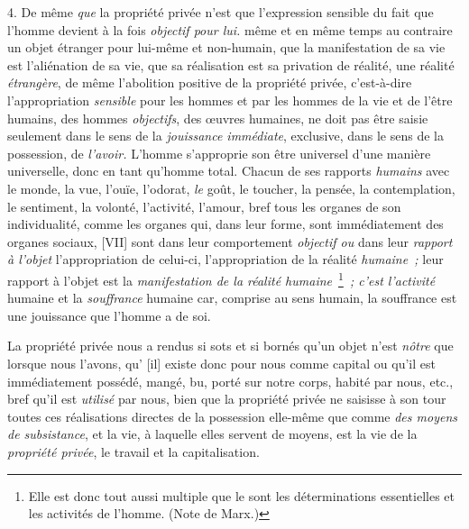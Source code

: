 \documentclass[french,twoside]{book} %
\begin{document}
4. De même \emph{que} la propriété privée n’est que l’expression sensible du fait que l’homme devient à la fois \emph{objectif pour lui.} même et en même temps au contraire un objet étranger pour lui-même et non-humain, que la manifestation de sa vie est l’aliénation de sa vie, que sa réalisation est sa privation de réalité, une réalité \emph{étrangère}, de même l’abolition positive de la propriété privée, c’est-à-dire l’appropriation \emph{sensible} pour les hommes et par les hommes de la vie et de l’être humains, des hommes \emph{objectifs}, des œuvres humaines, ne doit pas être saisie seulement dans le sens de la \emph{jouissance immédiate}, exclusive, dans le sens de la possession, de \emph{l’avoir.} L’homme s’approprie son être universel d’une manière universelle, donc en tant qu’homme total. Chacun de ses rapports \emph{humains} avec le monde, la vue, l’ouïe, l’odorat, \emph{le} goût, le toucher, la pensée, la contemplation, le sentiment, la volonté, l’activité, l’amour, bref tous les organes de son individualité, comme les organes qui, dans leur forme, sont immédiatement des organes sociaux, [VII] sont dans leur comportement \emph{objectif ou} dans leur \emph{rapport à l’objet} l’appropriation de celui-ci, l’appropriation de la réalité \emph{humaine ;} leur rapport à l’objet est la \emph{manifestation de la réalité humaine} \footnote{Elle est donc tout aussi multiple que le sont les déterminations essentielles et les activités de l’homme. (Note de Marx.)}\emph{ ; c’est l’activité} humaine et la \emph{souffrance} humaine car, comprise au sens humain, la souffrance est une jouissance que l’homme a de soi.\par
La propriété privée nous a rendus si sots et si bornés qu’un objet n’est \emph{nôtre} que lorsque nous l’avons, qu’ [il] existe donc pour nous comme capital ou qu’il est immédiatement possédé, mangé, bu, porté sur notre corps, habité par nous, etc., bref qu’il est \emph{utilisé} par nous, bien que la propriété privée ne saisisse à son tour toutes ces réalisations directes de la possession elle-même que comme \emph{des moyens de subsistance}, et la vie, à laquelle elles servent de moyens, est la vie de la \emph{propriété privée}, le travail et la capitalisation.\par
\end{document}
